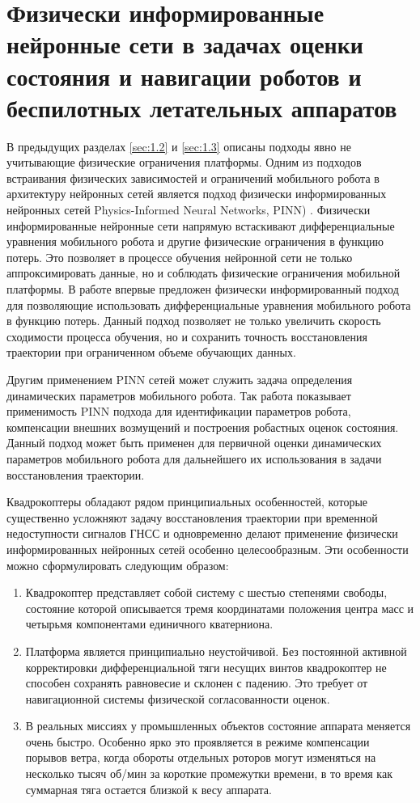 \section{Физически информированные нейронные сети в задачах оценки состояния и навигации роботов и беспилотных летательных аппаратов}
\label{sec:1.4}

В предыдущих разделах \ref{sec:1.2} и \ref{sec:1.3} описаны подходы явно не учитывающие физические ограничения платформы. Одним из подходов встраивания физических зависимостей и ограничений мобильного робота в архитектуру нейронных сетей является подход физически информированных нейронных сетей Physics-Informed Neural Networks, PINN) \cite{Raissi2019}. Физически информированные нейронные сети напрямую встаскивают дифференциальные уравнения мобильного робота и другие физические ограничения в функцию потерь. Это позволяет в процессе обучения нейронной сети не только аппроксимировать данные, но и соблюдать физические ограничения мобильной платформы. В работе \cite{Raissi2019} впервые предложен физически информированный подход для позволяющие использовать дифференциальные уравнения мобильного робота в функцию потерь. Данный подход позволяет не только увеличить скорость сходимости процесса обучения, но и сохранить точность восстановления траектории при ограниченном объеме обучающих данных. 

Другим применением PINN сетей может служить задача определения динамических параметров мобильного робота. Так работа \cite{Sivtsov2025} показывает применимость PINN подхода для идентификации параметров робота, компенсации внешних возмущений и построения робастных оценок состояния. Данный подход может быть применен для первичной оценки динамических параметров мобильного робота для дальнейшего их использования в задачи восстановления траектории. 


Квадрокоптеры обладают рядом принципиальных особенностей, которые существенно усложняют задачу восстановления траектории при временной недоступности сигналов ГНСС и одновременно делают применение физически информированных нейронных сетей особенно целесообразным. Эти особенности можно сформулировать следующим образом:

\begin{enumerate}
	\item Квадрокоптер представляет собой систему с шестью степенями свободы, состояние которой описывается тремя координатами положения центра масс и четырьмя компонентами единичного кватерниона. 
	\item Платформа является принципиально неустойчивой. Без постоянной активной корректировки дифференциальной тяги несущих винтов квадрокоптер не способен сохранять равновесие и склонен с падению. Это требует от навигационной системы физической согласованности оценок.
	\item В реальных миссиях у промышленных объектов состояние аппарата меняется очень быстро. Особенно ярко это проявляется в режиме компенсации порывов ветра, когда обороты отдельных роторов могут изменяться на несколько тысяч об/мин за короткие промежутки времени, в то время как суммарная тяга остается близкой к весу аппарата.
\end{enumerate}

